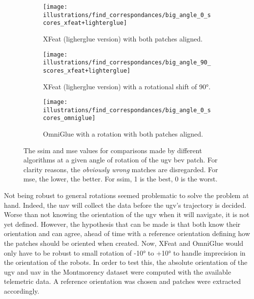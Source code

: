 \begin{figure}[ht!]
    \centering
    \begin{subfigure}[t]{0.32\textwidth}
        \texttt{[image: illustrations/find\_correspondances/big\_angle\_0\_scores\_xfeat+lighterglue]}
        \caption{XFeat (ligherglue version) with both patches aligned.}
        \label{fig:find_corr:big_angles:mse_ssim_xfeat+lg_0}
    \end{subfigure}
    \hfill
    \begin{subfigure}[t]{0.32\textwidth}
        \texttt{[image: illustrations/find\_correspondances/big\_angle\_90\_scores\_xfeat+lighterglue]}
        \caption{XFeat (ligherglue version) with a rotational shift of 90°.}
        \label{fig:find_corr:big_angles:mse_ssim_xfeat+lg_90}
    \end{subfigure}
    \hfill
    \begin{subfigure}[t]{0.32\textwidth}
        \texttt{[image: illustrations/find\_correspondances/big\_angle\_0\_scores\_omniglue]}
        \caption{OmniGlue with a rotation with both patches aligned.}
        \label{fig:find_corr:big_angles:mse_ssim_omniglue_0}
    \end{subfigure}
    \caption{The \gls{ssim} and \gls{mse} values for comparisons made by different algorithms at a given angle of rotation of the \gls{ugv} \gls{bev} patch.
    For clarity reasons, the \textit{obviously wrong} matches are disregarded.
    For \gls{mse}, the lower, the better. For \gls{ssim}, 1 is the best, 0 is the worst.}
    \label{fig:find_corr:big_angles:mse_ssim}
\end{figure}

Not being robust to general rotations seemed problematic to solve the problem at hand.
Indeed, the \gls{uav} will collect the data before the \gls{ugv}'s trajectory is decided.
Worse than not knowing the orientation of the \gls{ugv} when it will navigate, it is not yet defined.
However, the hypothesis that can be made is that both know their orientation and can agree, ahead of time with a reference
orientation defining how the patches should be oriented when created.
Now, XFeat and OmniGlue would only have to be robust to small rotation of -10° to +10° to handle imprecision in the orientation of the robots.
In order to test this, the absolute orientation of the \gls{ugv} and \gls{uav} in the Montmorency dataset
were computed with the available telemetric data.
A reference orientation was chosen and patches were extracted accordingly.

